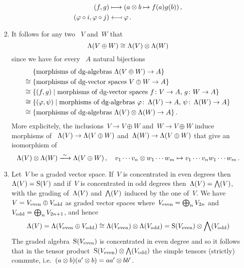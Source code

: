 \begin{enumerate}
\begin{align*}
      (f, g)
      &\longmapsto
      (a \otimes b \mapsto f(a) g(b)) \,,
      \\
      (\varphi \circ i, \varphi \circ j)
      &\longmapsfrom
      \varphi \,.
    \end{align*}
  \item
    It follows for any two {\dgvs}~$V$ and~$W$ that
    \[
      \operatorname{\Lambda}(V \oplus W)
      \cong
      \operatorname{\Lambda}(V) \otimes \operatorname{\Lambda}(W)
    \]
    since we have for every {\dga}~$A$ natural bijections
    \begin{align*}
      {}&
      \{ \text{morphisms of {\dgas}~$\dgSymm(V \oplus W) \to A$} \}
      \\
      \cong{}&
      \{ \text{morphisms of {\dgvs}~$V \oplus W \to A$} \}
      \\
      \cong{}&
      \{
        (f,g)
      \suchthat
        \text{morphisms of {\dgvs}~$f \colon V \to A$,~$g \colon W \to A$}
      \}
      \\
      \cong{}&
      \{
        (\varphi, \psi)
      \suchthat
        \text{morphisms of {\dgas}~$\varphi \colon \dgSymm(V) \to A$,~$\psi \colon \dgSymm(W) \to A$}
      \}
      \\
      \cong{}&
      \{ \text{morphisms of {\dgas}~$\dgSymm(V) \tensor \dgSymm(W) \to A$} \} \,.
    \end{align*}
    More explicitely, the inclusions~$V \to V \oplus W$ and~$W \to V \oplus W$ induce morphisms of {\dgas}~$\operatorname{\Lambda}(V) \to \operatorname{\Lambda}(V \oplus W)$ and~$\operatorname{\Lambda}(W) \to \operatorname{\Lambda}(V \oplus W)$ that give an isomorphism of {\dgas}
    \[
      \dgSymm(V) \tensor \dgSymm(W)
      \xlongto{\sim}
      \dgSymm(V \oplus W) \,,
      \quad
      v_1 \dotsm v_n \tensor w_1 \dotsm w_m
      \mapsto
      v_1 \dotsm v_n w_1 \dotsm w_m \,.
    \]
  \item
    Let~$V$ be a graded vector space.
    If~$V$ is concentrated in even degrees then~$\operatorname{\Lambda}(V) = \operatorname{S}(V)$ and if~$V$ is concentrated in odd degrees then~$\operatorname{\Lambda}(V) = \bigwedge(V)$, with the grading of~$\operatorname{\Lambda}(V)$ and~$\bigwedge(V)$ induced by the one of~$V$.
    We have~$V = V_{\mathrm{even}} \oplus V_{\mathrm{odd}}$ as graded vector spaces where~$V_{\mathrm{even}} = \bigoplus_n V_{2n}$ and~$V_{\mathrm{odd}} = \bigoplus_n V_{2n+1}$, and hence
    \[
      \operatorname{\Lambda}(V)
      =
      \operatorname{\Lambda}(V_{\mathrm{even}} \oplus V_{\mathrm{odd}})
      \cong
      \operatorname{\Lambda}(V_{\mathrm{even}}) \otimes \operatorname{\Lambda}(V_{\mathrm{odd}})
      =
      \operatorname{S}(V_{\mathrm{even}}) \otimes \bigwedge(V_{\mathrm{odd}})
    \]
    The graded algebra~$\operatorname{S}(V_{\mathrm{even}})$ is concentrated in even degree and so it follows that in the tensor product~$\operatorname{S}(V_{\mathrm{even}}) \otimes \bigwedge(V_{\mathrm{odd}})$ the simple tensors (strictly) commute, i.e.~$(a \otimes b)(a' \otimes b) = a a' \otimes b b'$.

\end{enumerate}
